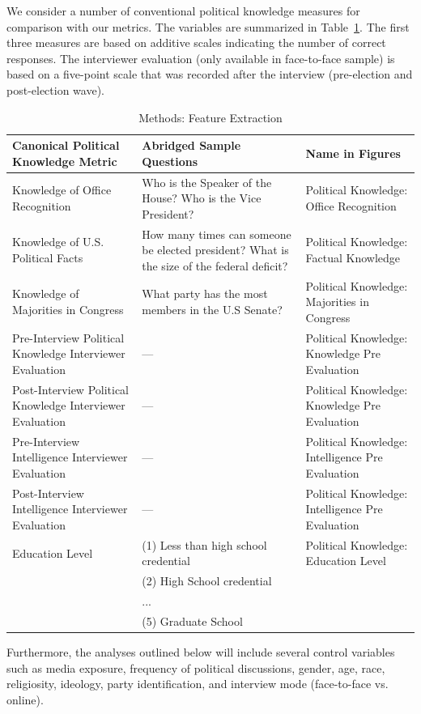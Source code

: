 \documentclass[12pt]{article}
\begin{document}
We consider a number of conventional political knowledge measures for comparison with our metrics. The variables are summarized in Table~\ref{tab:featextr}. The first three measures are based on additive scales indicating the number of correct responses. The interviewer evaluation (only available in face-to-face sample) is based on a five-point scale that was recorded after the interview (pre-election and post-election wave).

\begin{table}\onehalfspacing\footnotesize
\begin{tabular}{p{5.5cm}p{5.5cm}p{5.5cm}}
\hline
Canonical Political Knowledge Metric &	Abridged Sample Questions &	Name in Figures \\
\hline
Knowledge of Office Recognition  	  & Who is the Speaker of the House? Who is the Vice President? &  Political Knowledge: Office Recognition \\ 
Knowledge of U.S. Political Facts 	 & How many times can someone be elected president? What is the size of the federal deficit? & Political Knowledge: Factual Knowledge\\
Knowledge of Majorities in Congress & What party has the most members in the U.S Senate? & Political Knowledge: Majorities in Congress\\
Pre-Interview Political Knowledge Interviewer Evaluation & --- & Political Knowledge: Knowledge Pre Evaluation\\
Post-Interview Political Knowledge Interviewer Evaluation & --- & Political Knowledge: Knowledge Pre Evaluation\\
Pre-Interview Intelligence Interviewer Evaluation & --- & Political Knowledge: Intelligence Pre Evaluation\\
Post-Interview Intelligence Interviewer Evaluation & --- & Political Knowledge: Intelligence Pre Evaluation\\
Education Level 	 & (1) Less than high school credential&Political Knowledge: Education Level \\
&(2) High School credential&\\
&...&\\
&(5) Graduate School & \\
\hline 
\end{tabular} 
\caption{Methods: Feature Extraction}\label{tab:featextr}
\end{table}

Furthermore, the analyses outlined below will include several control variables such as media exposure, frequency of political discussions, gender, age, race, religiosity, ideology, party identification, and interview mode (face-to-face vs. online).
	
\end{document}
